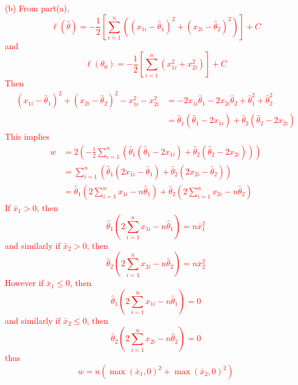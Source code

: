 \documentclass[12pt]{article}
\begin{document}
\noindent \textcolor{red}{
(b) From part(a), 
\begin{equation*}
    \ell(\hat\theta) = -\frac{1}{2}\left[\sum_{i=1}^n \left((x_{1i} - \hat\theta_1)^2 + (x_{2i} - \hat\theta_2)^2 \right)\right] + C
\end{equation*}
and 
\begin{equation*}
    \ell(\theta_0) =  -\frac{1}{2}\left[\sum_{i=1}^n \left(x_{1i}^2 + x_{2i}^2 \right)\right] + C
\end{equation*}
Then 
\begin{align*}
    (x_{1i} - \hat\theta_1)^2 + (x_{2i} - \hat\theta_2)^2 - x_{1i}^2 - x_{2i}^2 &= -2x_{1i}\hat\theta_1 - 2x_{2i}\hat\theta_2 + \hat\theta_1^2 + \hat\theta_2^2\\
    &= \hat\theta_1(\hat\theta_1 - 2x_{1i}) + \hat\theta_2(\hat\theta_2 - 2x_{2i})
\end{align*}
This implies 
\begin{align*}
    w &= 2\left(-\frac{1}{2}\sum_{i=1}^n (\hat\theta_1(\hat\theta_1 - 2x_{1i}) + \hat\theta_2(\hat\theta_2 - 2x_{2i}))\right)\\
    &= \sum_{i=1}^n \left(\hat\theta_1(2x_{1i} - \hat\theta_1) + \hat\theta_2(2x_{2i} - \hat\theta_2)\right) \\
    &= \hat\theta_1 \left(2\sum_{i=1}^n x_{1i} - n\hat\theta_1\right) + \hat\theta_2\left(2\sum_{i=1}^n x_{2i} - n\hat\theta_2\right)
\end{align*}
If $\bar x_1 > 0$, then 
\begin{equation*}
    \hat\theta_1 \left(2\sum_{i=1}^n x_{1i} - n\hat\theta_1\right) = n\bar x_1^2
\end{equation*}
and similarly if $\bar x_2 > 0$, then 
\begin{equation*}
    \hat\theta_2 \left(2\sum_{i=1}^n x_{2i} - n\hat\theta_2\right) = n\bar x_2^2
\end{equation*}
However if $\bar x_1 \leq 0$, then 
\begin{equation*}
    \hat\theta_1 \left(2\sum_{i=1}^n x_{1i} - n\hat\theta_1\right) = 0
\end{equation*}
and similarly if $\bar x_2 \leq 0$, then 
\begin{equation*}
    \hat\theta_2 \left(2\sum_{i=1}^n x_{2i} - n\hat\theta_2\right) = 0
\end{equation*}
thus 
\begin{equation*}
    w =n \left(\max(\bar x_1, 0)^2 + \max(\bar x_2 , 0)^2\right)
\end{equation*}
}
\end{document}
